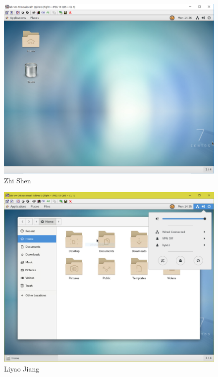 \documentclass[letterpaper]{article}
\begin{document}
\begin{figure}[H]
 \centering
 \includegraphics[width=\textwidth]{max.PNG}
 \caption{Zhi Shen}
\end{figure}

\begin{figure}[H]
 \centering
 \includegraphics[width=\textwidth]{liyao.JPG}
 \caption{Liyao Jiang}
\end{figure}
\end{document}
